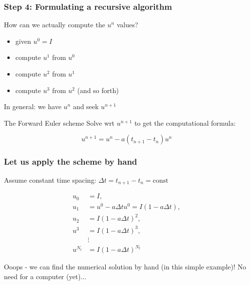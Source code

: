 \documentclass{beamer}
\begin{document}
\begin{frame}
\frametitle{Step 4: Formulating a recursive algorithm}


How can we actually compute the $u^n$ values?

\begin{itemize}
  \item given $u^0=I$

  \item compute $u^1$ from $u^0$

  \item compute $u^2$ from $u^1$

  \item compute $u^3$ from $u^2$ (and so forth)
\end{itemize}

\noindent
In general: we have $u^n$ and seek $u^{n+1}$

\begin{block}{The Forward Euler scheme }
Solve wrt $u^{n+1}$ to get the computational formula:

\begin{equation}
u^{n+1} = u^n - a(t_{n+1} -t_n)u^n
\label{decay:FE}
\end{equation}
\end{block}
\end{frame}

\begin{frame}
\frametitle{Let us apply the scheme by hand}

Assume constant time spacing: $\Delta t = t_{n+1}-t_n=\mbox{const}$

\begin{align*}
u_0 &= I,\\ 
u_1 & = u^0 - a\Delta t u^0 = I(1-a\Delta t),\\ 
u_2 & = I(1-a\Delta t)^2,\\ 
u^3 &= I(1-a\Delta t)^3,\\ 
&\vdots\\ 
u^{N_t} &= I(1-a\Delta t)^{N_t}
\end{align*}

Ooops - we can find the numerical solution by hand (in this simple
example)! No need for a computer (yet)...
\end{frame}
\end{document}
